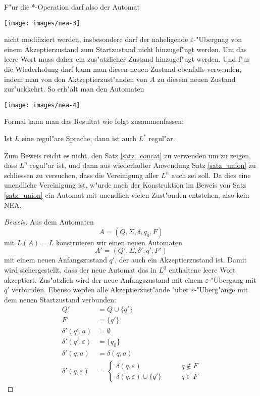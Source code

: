 F"ur die *-Operation darf also der Automat
\begin{center}
\texttt{[image: images/nea-3]}
\end{center}
nicht modifiziert werden, insbesondere darf der naheligende
$\varepsilon$-"Ubergnag von einem Akzeptierzustand zum Startzustand
nicht hinzugef"ugt werden.
Um das leere Wort muss daher ein zus"atzlicher Zustand hinzugef"ugt werden.
Und f"ur die Wiederholung darf kann man diesen neuen Zustand ebenfalls
verwenden, indem man von den Aktzeptierzust"anden von $A$ zu diesem
neuen Zustand zur"uckkehrt.
So erh"alt man den Automaten
\begin{center}
\texttt{[image: images/nea-4]}
\end{center}

Formal kann man das Resultat wie folgt zusammenfassen:
\begin{satz}
\label{satz_star}
Ist $L$ eine regul"are Sprache, dann ist auch $L^*$ regul"ar.
\end{satz}

Zum Beweis reicht es nicht, den Satz \ref{satz_concat} zu verwenden
um zu zeigen, dass $L^n$ regul"ar ist, und dann aus wiederholter
Anwendung Satz \ref{satz_union} zu schliessen zu versuchen,
dass die Vereinigung aller $L^n$ auch sei soll. Da dies eine unendliche
Vereinigung ist, w"urde nach der Konstruktion im Beweis von Satz
\ref{satz_union} ein Automat mit unendlich vielen
Zust"anden entstehen, also kein NEA.

\begin{proof}[Beweis]
Aus dem Automaten
\[
A=(Q,\Sigma, \delta,q_0,F)
\]
mit $L(A)=L$ konstruieren wir einen neuen
Automaten
\[
A'=(Q',\Sigma,\delta',q',F')
\]
mit einem neuen Anfangszustand $q'$, der auch
ein Akzeptierzustand ist.
Damit wird sichergestellt, dass der neue Automat das in $L^0$
enthaltene leere Wort akzeptiert.
Zus"atzlich wird der neue Anfangszustand mit einem $\varepsilon$-"Ubergang
mit $q'$ verbunden. 
Ebenso werden alle Akzeptierzust"ande "uber $\varepsilon$-"Uberg"ange
mit dem neuen Startzustand verbunden:
\begin{align*}
Q'&=Q\cup \{q'\}\\
F'&=\{q'\}\\
\delta'(q',a)&=\emptyset\\
\delta'(q',\varepsilon)&= \{q_0\}\\
\delta'(q,a)&= \delta(q,a)\\
\delta'(q,\varepsilon)&=\begin{cases}
\delta(q,\varepsilon)          &\qquad q\not\in F\\
\delta(q,\varepsilon)\cup\{q'\}&\qquad q\in F
\end{cases}
\end{align*}
\end{proof}
